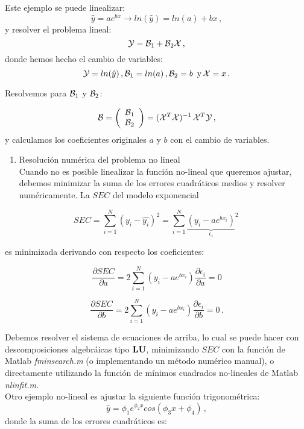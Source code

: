 \documentclass[
]{agujournal2019}
\providecommand{\tightlist}{%
  \setlength{\itemsep}{0pt}\setlength{\parskip}{0pt}}\usepackage{longtable,booktabs,array}
\begin{document}
Este ejemplo se puede linealizar:
\[\hat{y}=a e^{bx}\rightarrow ln(\hat{y})=ln(a) + bx\,,\] y resolver el
problema lineal: \[{\cal Y}={\cal B}_1 + {\cal B}_2 {\cal X}\,,\] donde
hemos hecho el cambio de variables:
\[{\cal Y}=ln(\hat{y})\,,{\cal B}_1=ln(a)\,,{\cal B}_2=b\,\,\,{\rm y}\,{\cal X}=x\,.\]

Resolvemos para \({\cal B}_1\) y \({\cal B}_2\):

\[{\cal B}=\left(\begin{array}{c}
            {\cal B}_1\\
            {\cal B}_2\\
              \end{array}\right)=({\cal X}^T {\cal X})^{-1}\,{\cal X}^T{\cal Y}
\,,\] y calculamos los coeficientes originales \(a\) y \(b\) con el
cambio de variables.

\vspace{0.5cm}

\begin{enumerate}
\def\labelenumi{\arabic{enumi}.}
\setcounter{enumi}{1}
\tightlist
\item
  Resolución numérica del problema no lineal\\
  Cuando no es posible linealizar la función no-lineal que queremos
  ajustar, debemos minimizar la suma de los errores cuadráticos medios y
  resolver numéricamente. La \(SEC\) del modelo exponencial
\end{enumerate}

\[SEC=\sum\limits^N_{i=1}(y_i-\hat{y_i})^2=\sum\limits^N_{i=1}
              {\underbrace{\left(y_i - a e^{bx_i}\right)}_{\epsilon_i}}^2\,\]

es minimizada derivando con respecto los coeficientes:

\[\frac{\partial{SEC}}{\partial{a}}=
      2\sum\limits^N_{i=1}\left(y_i - a e^{bx_i}\right)\frac{\partial{\epsilon_i}}{\partial{a}}=0\]

\[\frac{\partial{SEC}}{\partial{b}}=
2\sum\limits^N_{i=1}\left(y_i - a e^{bx_i}\right)\frac{\partial{\epsilon_i}}{\partial{b}}=0\,.\]

Debemos resolver el sistema de ecuaciones de arriba, lo cual se puede
hacer con descomposiciones algebráicas tipo \({\textbf L}{\textbf U}\),
minimizando \(SEC\) con la función de Matlab \emph{fminsearch.m} (o
implementando un método numérico manual), o directamente utilizando la
función de mínimos cuadrados no-lineales de Matlab \emph{nlinfit.m}.\\
Otro ejemplo no-lineal es ajustar la siguiente función trigonométrica:
\[\hat{y}=\phi_1 e^{\phi_2 x} cos(\phi_3 x + \phi_4)\,,\] donde la suma
de los errores cuadráticos es:
\end{document}
